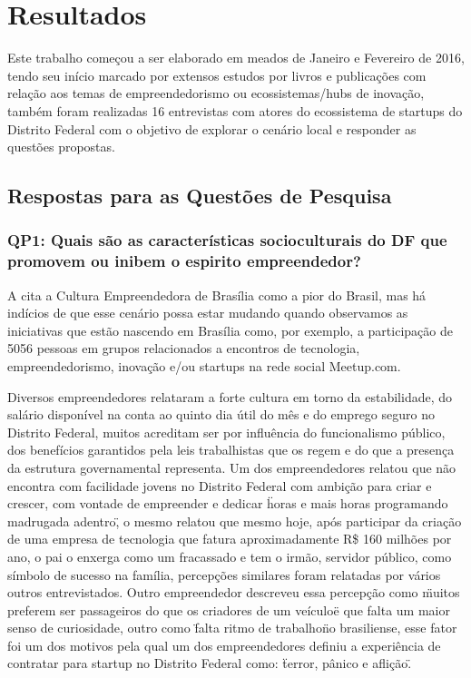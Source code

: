 \chapter[Resultados]{Resultados}
\label{cap-resultados}

Este trabalho começou a ser elaborado em meados de Janeiro e Fevereiro de 2016, tendo seu início marcado por extensos estudos por livros e publicações com relação aos temas de empreendedorismo ou ecossistemas/hubs de inovação, também foram realizadas 16 entrevistas com atores do ecossistema de startups do Distrito Federal com o objetivo de explorar o cenário local e responder as questões propostas.

\section{Respostas para as Questões de Pesquisa}
\label{section:perguntas_de_pesquisa}

\subsection{QP1: Quais são as características socioculturais do DF que promovem ou inibem o espirito empreendedor?}
\label{subsection:pergunta_de_pesquisa_1}

A  cita a Cultura Empreendedora de Brasília como a pior do Brasil, mas há indícios de que esse cenário possa estar mudando quando observamos as iniciativas que estão nascendo em Brasília como, por exemplo, a participação de 5056 pessoas em grupos relacionados a encontros de tecnologia, empreendedorismo, inovação e/ou startups na rede social Meetup.com.

Diversos empreendedores relataram a forte cultura em torno da estabilidade, do salário disponível na conta ao quinto dia útil do mês e do emprego seguro no Distrito Federal, muitos acreditam ser por influência do funcionalismo público, dos benefícios garantidos pela leis trabalhistas que os regem e do que a presença da estrutura governamental representa. Um dos empreendedores relatou que não encontra com facilidade jovens no Distrito Federal com ambição para criar e crescer, com vontade de empreender e dedicar \"horas e mais horas programando madrugada adentro\", o mesmo relatou que mesmo hoje, após participar da criação de uma empresa de tecnologia que fatura aproximadamente R\$ 160 milhões por ano, o pai o enxerga como um fracassado e tem o irmão, servidor público, como símbolo de sucesso na família, percepções similares foram relatadas por vários outros entrevistados. Outro empreendedor descreveu essa percepção como \"muitos preferem ser passageiros do que os criadores de um veículo\" e que falta um maior senso de curiosidade, outro como \"falta ritmo de trabalho\" no brasiliense, esse fator foi um dos motivos pela qual um dos empreendedores definiu a experiência de contratar para startup no Distrito Federal como: \"terror, pânico e aflição\". 

